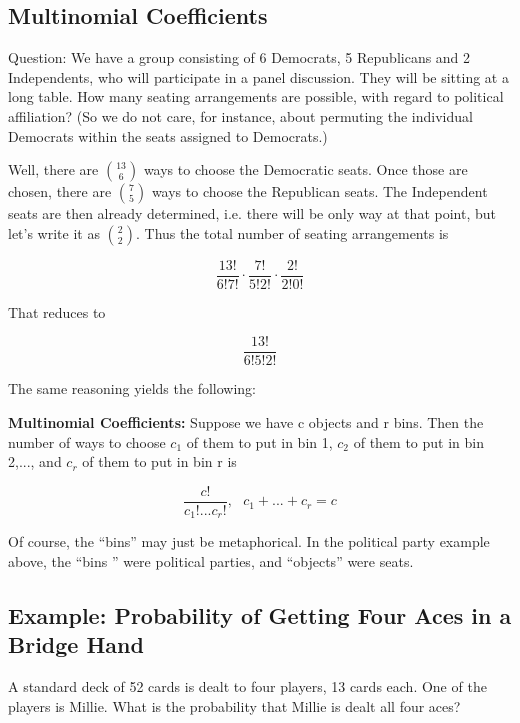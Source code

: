 \subsection{Multinomial Coefficients}
\label{multnomcoeff}

Question:  We have a group consisting of 6 Democrats, 5 Republicans and
2 Independents, who will participate in a panel discussion.  They will
be sitting at a long table.  How many seating arrangements are possible,
with regard to political affiliation?  (So we do not care, for instance,
about permuting the individual Democrats within the seats assigned to
Democrats.)

Well, there are $\binom{13}{6}$ ways to choose the Democratic seats.
Once those are chosen, there are $\binom{7}{5}$ ways to choose the
Republican seats.  The Independent seats are then already determined,
i.e. there will be only way at that point, but let's write it as
$\binom{2}{2}$.  Thus the total number of seating arrangements is

\begin{equation}
\frac{13!}{6!7!} \cdot
\frac{7!}{5!2!} \cdot
\frac{2!}{2!0!} 
\end{equation}

That reduces to

\begin{equation}
\frac{13!}{6!5!2!}
\end{equation}

The same reasoning yields the following:

{\bf Multinomial Coefficients:} Suppose we have c objects and r bins.
Then the number of ways to choose $c_1$ of them to put in bin 1, $c_2$
of them to put in bin 2,..., and $c_r$ of them to put in bin r is

\begin{equation}
\frac{c!}{c_1!...c_r!}, ~~~ c_1+...+c_r = c
\end{equation}

Of course, the ``bins'' may just be metaphorical.  In the political
party example above, the ``bins '' were political parties, and
``objects'' were seats.

\subsection{Example:  Probability of Getting Four Aces in a Bridge
Hand}

A standard deck of 52 cards is dealt to four players, 13 cards each.
One of the players is Millie.  What is the probability that Millie is
dealt all four aces?

